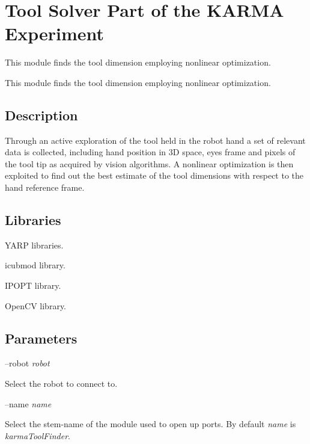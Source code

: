 \section{Tool Solver Part of the K\+A\+R\+M\+A Experiment}
\label{group__karmaToolFinder}


This module finds the tool dimension employing nonlinear optimization.  


This module finds the tool dimension employing nonlinear optimization. 

\hypertarget{group__karmaToolProjection_intro_sec}{}\subsection{Description}\label{group__karmaToolProjection_intro_sec}
Through an active exploration of the tool held in the robot hand a set of relevant data is collected, including hand position in 3\+D space, eye\textquotesingle{}s frame and pixels of the tool tip as acquired by vision algorithms. A nonlinear optimization is then exploited to find out the best estimate of the tool dimensions with respect to the hand reference frame.\hypertarget{group__karmaToolProjection_lib_sec}{}\subsection{Libraries}\label{group__karmaToolProjection_lib_sec}

\begin{DoxyItemize}
\item Y\+A\+R\+P libraries.
\item icubmod library.
\item I\+P\+O\+P\+T library.
\item Open\+C\+V library.
\end{DoxyItemize}\hypertarget{group__karmaToolProjection_parameters_sec}{}\subsection{Parameters}\label{group__karmaToolProjection_parameters_sec}
--robot {\itshape robot} 
\begin{DoxyItemize}
\item Select the robot to connect to.
\end{DoxyItemize}

--name {\itshape name} 
\begin{DoxyItemize}
\item Select the stem-\/name of the module used to open up ports. By default {\itshape name} is {\itshape karma\+Tool\+Finder}.
\end{DoxyItemize}

